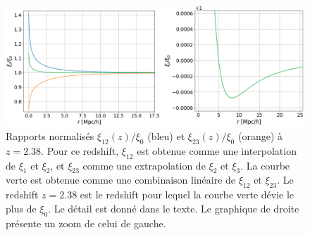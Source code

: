\documentclass[11pt, twoside, a4paper, openright]{report}
\begin{document}
\begin{figure}
  \centering
  \includegraphics[scale=0.45]{qsolognormal3}
  \caption{Rapports normalisés $\xi_{12}(z) / \xi_0$ (bleu) et $\xi_{23}(z) / \xi_0$ (orange) à $z = \num{2.38}$. Pour ce redshift, $\xi_{12}$ est obtenue comme une interpolation de $\xi_1$ et $\xi_2$, et $\xi_{23}$ comme une extrapolation de $\xi_{2}$ et $\xi_{3}$. La courbe verte est obtenue comme une combinaison linéaire de $\xi_{12}$ et $\xi_{23}$. Le redshift $z = \num{2.38}$ est le redshift pour lequel la courbe verte dévie le plus de $\xi_0$. Le détail est donné dans le texte. Le graphique de droite présente un zoom de celui de gauche.}
  \label{fig:qsolognormal3}
\end{figure}



\end{document}
